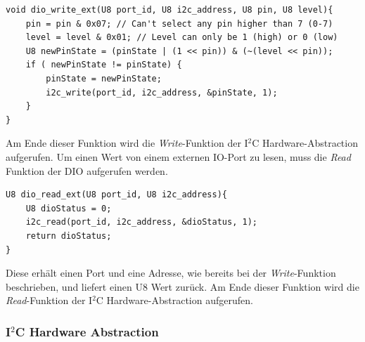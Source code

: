 \begin{lstlisting}[frame=single,caption={Aufruf der I$^2$C Hardware Abstraction},captionpos=b]  
void dio_write_ext(U8 port_id, U8 i2c_address, U8 pin, U8 level){
	pin = pin & 0x07; // Can't select any pin higher than 7 (0-7)
	level = level & 0x01; // Level can only be 1 (high) or 0 (low)
	U8 newPinState = (pinState | (1 << pin)) & (~(level << pin));
	if ( newPinState != pinState) {
		pinState = newPinState;
		i2c_write(port_id, i2c_address, &pinState, 1);
	}
}
\end{lstlisting}
Am Ende dieser Funktion wird die \textit{Write}-Funktion der I$^2$C Hardware-Abstraction aufgerufen.\newline \newline
Um einen Wert von einem externen IO-Port zu lesen, muss die \textit{Read} Funktion der DIO aufgerufen werden.
\begin{lstlisting}[frame=single,caption={Aufruf der I$^2$C Hardware Abstraction},captionpos=b]  
U8 dio_read_ext(U8 port_id, U8 i2c_address){
	U8 dioStatus = 0;
	i2c_read(port_id, i2c_address, &dioStatus, 1);
	return dioStatus;
}
\end{lstlisting}
Diese erhält einen Port und eine Adresse, wie bereits bei der \textit{Write}-Funktion beschrieben, und liefert einen U8 Wert zurück.
Am Ende dieser Funktion wird die \textit{Read}-Funktion der I$^2$C Hardware-Abstraction aufgerufen.\newline \newline

\subsubsection{I$^2$C Hardware Abstraction} \label{i2cabstraction}

